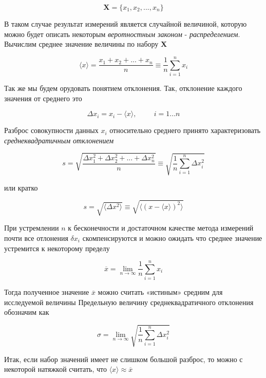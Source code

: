 \documentclass[12pt]{article}
\begin{document}
      $$
        \textbf{X} = \{x_1, x_2, ..., x_n\}
      $$

      В таком случае результат измерений является случайной величиной, которую
      можно будет описать некоторым \textit{веротностным законом} - \textit{распределением}.
      Вычислим среднее значение величины по набору \textbf{X}

      \begin{equation}
        \langle x \rangle = \frac{x_1 + x_2 + ... + x_n}{n} \equiv
        \frac{1}{n} \sum_{i=1}^n x_i
      \end{equation}

      Так же мы будем орудовать понятием отклонения. Так, отклонение каждого значения
      от среднего это

      $$
        \Delta x_i = x_i - \langle x \rangle, \hspace{1cm} i = 1...n
      $$

      Разброс совокупности данных ${x_i}$ относительно среднего принято характеризовать
      \textit{среднеквадратичным отклонением}

      \begin{equation}
        s = \sqrt{\frac{\Delta x_1^2 + \Delta x_2^2 + ... + \Delta x_n^2}{n}} \equiv
        \sqrt{\frac{1}{n} \sum_{i=1}^n \Delta x_i^2}
      \end{equation}

      или кратко

      \begin{equation}
        s = \sqrt{\langle \Delta x^2 \rangle} \equiv \sqrt{\langle (x - \langle x \rangle)^2 \rangle}
      \end{equation}

      При устремлении $n$ к бесконечности и достаточном качестве метода измерений почти
      все отлонения $\delta x_i$ скомпенсируются и можно ожидать что среднее значение устремится
      к некоторому пределу

      $$
        \overline{x} = \lim_{n \rightarrow \infty} \frac{1}{n} \sum_{i=1}^n x_i
      $$

      Тогда полученное значение $\overline{x}$ можно считать «истиным» средним для исследуемой величины
      Предельную величину среднеквадратичного отклонения обозначим как

      $$
        \sigma = \lim_{n \rightarrow \infty} \sqrt{\frac{1}{n} \sum_{i=1}^n \Delta x_i^2}
      $$

      Итак, если набор значений имеет не слишком большой разброс, то можно с некоторой
      натяжкой считать, что $\langle x \rangle \approx \overline{x}$
\end{document}
